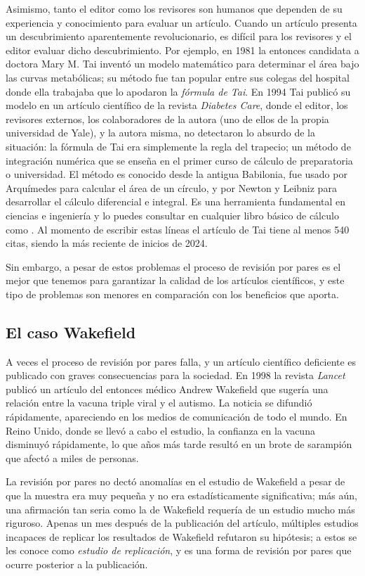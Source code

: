 Asimismo, tanto el editor como los revisores son humanos que dependen de su
experiencia y conocimiento para evaluar un artículo.
Cuando un artículo presenta un descubrimiento aparentemente revolucionario, es
difícil para los revisores y el editor evaluar dicho descubrimiento.
Por ejemplo, en 1981 la entonces candidata a doctora Mary M. Tai inventó un
modelo matemático para determinar el área bajo las curvas metabólicas; su método
fue tan popular entre sus colegas del hospital donde ella trabajaba que lo
apodaron la \emph{fórmula de Tai}.
En 1994 Tai publicó su modelo en un artículo científico de la revista
\emph{Diabetes Care}\cite{Tai1994}, donde el editor, los revisores externos,
los colaboradores de la autora (uno de ellos de la propia universidad de Yale),
y la autora misma, no detectaron lo absurdo de la situación: la fórmula de Tai
era simplemente la regla del trapecio; un método de integración numérica que se
enseña en el primer curso de cálculo de preparatoria o universidad.
El método es conocido desde la antigua Babilonia, fue usado por Arquímedes para
calcular el área de un círculo, y por Newton y Leibniz para desarrollar el
cálculo diferencial e integral.
Es una herramienta fundamental en ciencias e ingeniería y lo puedes consultar en
cualquier libro básico de cálculo como \cite{Arizmendi2018}.
Al momento de escribir estas líneas el artículo de Tai tiene al menos 540 citas,
siendo la más reciente de inicios de 2024.

Sin embargo, a pesar de estos problemas el proceso de revisión por pares es el
mejor que tenemos para garantizar la calidad de los artículos científicos, y
este tipo de problemas son menores en comparación con los beneficios que aporta.

\subsection*{El caso Wakefield}
A veces el proceso de revisión por pares falla, y un artículo científico
deficiente es publicado con graves consecuencias para la sociedad.
En 1998 la revista \emph{Lancet} publicó un artículo del entonces médico Andrew
Wakefield que sugería una relación entre la vacuna triple viral y el autismo.
La noticia se difundió rápidamente, apareciendo en los medios de comunicación
de todo el mundo.
En Reino Unido, donde se llevó a cabo el estudio, la confianza en la vacuna
disminuyó rápidamente, lo que años más tarde resultó en un brote de sarampión
que afectó a miles de personas.

La revisión por pares no dectó anomalías en el estudio de Wakefield a pesar de
que la muestra era muy pequeña y no era estadísticamente significativa; más aún,
una afirmación tan seria como la de Wakefield requería de un estudio mucho más
riguroso.
Apenas un mes después de la publicación del artículo, múltiples estudios
incapaces de replicar los resultados de Wakefield refutaron su hipótesis; a
estos se les conoce como \emph{estudio de replicación}, y es una forma de
revisión por pares que ocurre posterior a la publicación.

